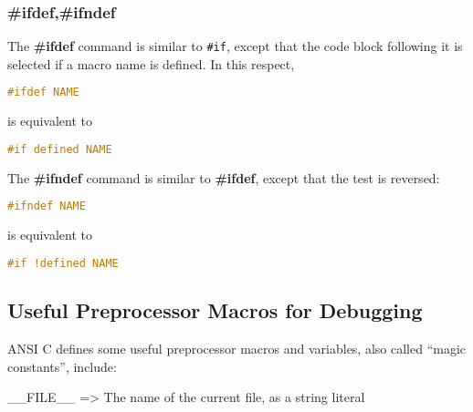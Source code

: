 \subsubsection{\#ifdef,\#ifndef}
The \textbf{\#ifdef} command is similar to \texttt{\#if}, except that the code
block following it is selected if a macro name is defined. In this respect,
\lstset{basicstyle=\scriptsize, numbers=left, captionpos=b, tabsize=4}
\begin{lstlisting}[caption=Section \thesection listing \arabic{preprocnt},language={C},
breaklines=true,xleftmargin=15pt, label=lst:section\thesection listing\arabic{preprocnt}]
#ifdef NAME
\end{lstlisting}

is equivalent to
\lstset{basicstyle=\scriptsize, numbers=left, captionpos=b, tabsize=4}
\begin{lstlisting}[caption=Section \thesection listing \arabic{preprocnt},language={C},
breaklines=true,xleftmargin=15pt, label=lst:section\thesection listing\arabic{preprocnt}]
#if defined NAME
\end{lstlisting}

The \textbf{\#ifndef} command is similar to \textbf{\#ifdef}, except that the
test is reversed:
\lstset{basicstyle=\scriptsize, numbers=left, captionpos=b, tabsize=4}
\begin{lstlisting}[caption=Section \thesection listing \arabic{preprocnt},language={C},
breaklines=true,xleftmargin=15pt, label=lst:section\thesection listing\arabic{preprocnt}]
#ifndef NAME
\end{lstlisting}

is equivalent to
\lstset{basicstyle=\scriptsize, numbers=left, captionpos=b, tabsize=4}
\begin{lstlisting}[caption=Section \thesection listing \arabic{preprocnt},language={C},
breaklines=true,xleftmargin=15pt, label=lst:section\thesection listing\arabic{preprocnt}]
#if !defined NAME
\end{lstlisting}

\subsection{Useful Preprocessor Macros for Debugging}
ANSI C defines some useful preprocessor macros and variables, also called ``magic constants'', include:

\_\_FILE\_\_ =\textgreater{} The name of the current file, as a string literal\\

